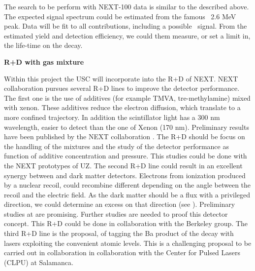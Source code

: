 The \bbonu search to be perform with NEXT-100 data is similar to the described above. The expected signal spectrum could be estimated from the famous \Tl ~2.6 MeV peak. 
Data will be fit to all contributions, including a possible \bbonu ~signal.
From the estimated yield and detection efficiency, we could them measure, or set a limit in, the life-time on the \bbonu decay.

{\bf R+D with gas mixture}

Within this project the USC will incorporate into the R+D of NEXT. 
NEXT collaboration pursues several R+D lines to improve the detector performance. 
The first one is the use of additives (for example TMVA, tre-methylamine) mixed with xenon.  These additives reduce the electron diffusion, which translate to a more confined trajectory.  In addition the scintillator light has  a 300 nm wavelength, easier to detect than the one of Xenon (170 nm). Preliminary results have been published by the NEXT collaboration \cite{NEXT-TMVA}. The R+D should be focus on the handling of the mixtures and the study of the detector performance as function of additive concentration and pressure. This studies could be done with the NEXT prototypes of UZ.
The second R+D line could result in an excellent synergy between \bb and dark matter detectors. Electrons from ionization produced by a nuclear recoil, could recombine different depending on the angle between the recoil and the electric field. As the dark matter should be a flux with a privileged direction, we could determine an excess on that direction (see \cite{NEXT-DM-1}). Preliminary studies at \cite{NEXT-DM} are promising. Further studies are needed to proof this detector concept. This R+D could be done in collaboration with the Berkeley group.
The third R+D line is the \BATA proposal, of tagging the Ba product of the \bbonu decay with lasers exploiting the convenient atomic levels. This is a challenging proposal to be carried out in collaboration in collaboration with the Center for Pulsed Lasers (CLPU) at Salamanca. 

 


